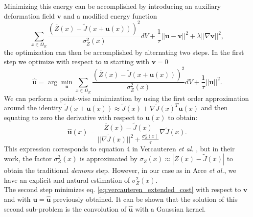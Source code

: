 Minimizing this energy can be accomplished by introducing an auxiliary deformation field $\mathbf{v}$ and a modified energy function
\begin{equation}\label{eq:vercauteren_extended_cost}
    \sum_{x \in \Omega_{R}} \frac{(\overline{Z}(x) - \tilde{J}(x + \mathbf{u}(x)))^{2}}{\sigma^{2}_{Z}(x)} dV + \frac{1}{\tau}||\mathbf{u}-\mathbf{v}||^{2}+\lambda ||\nabla \mathbf{v}||^{2},
\end{equation}
the optimization can then be accomplished by alternating two steps. In the first step we optimize with respect to $\mathbf{u}$ starting with $\mathbf{v} = 0$
\begin{equation}\label{eq:vercauteren_step1}
    \widehat{\mathbf{u}} = \arg\min_{\mathbf{u}}\sum_{x \in \Omega_{R}} \frac{(\overline{Z}(x) - \tilde{J}(x+\mathbf{u}(x)))^{2}}{\sigma^{2}_{Z}(x)} dV + \frac{1}{\tau} ||\mathbf{u}||^{2}.
\end{equation}
We can perform a point-wise minimization by using the first order approximation around the identity
$\tilde{J}(x+\mathbf{u}(x)) \approx \tilde{J}(x) + \nabla \tilde{J}(x)^{T}\mathbf{u}(x)$ and then equating to zero the derivative with respect to $\mathbf{u}(x)$ to obtain:
\begin{equation}\label{eq:euler_lagrange_step1}
    \widehat{\mathbf{u}}(x) = \frac{\overline{Z}(x) - \tilde{J}(x)}{||\nabla \tilde{J}(x)||^{2} + \frac{\sigma_{Z}^{2}(x)}{\tau}}\nabla \tilde{J}(x).
\end{equation}
This expression corresponds to equation 4 in Vercauteren {\it et al.} \cite{Vercauteren2009}, but in their work, the factor $\sigma_{Z}^{2}(x)$
is approximated by $\sigma_{Z}(x) \approx |\overline{Z}(x) - \tilde{J}(x)|$ to obtain the traditional {\it demons} step. However, in our case as in Arce
{\it et al.}\cite{Arce-santana2014}, we have an explicit and natural estimation of $\sigma^{2}_{Z}(x)$.\\

The second step minimizes eq. \ref{eq:vercauteren_extended_cost} with respect to $\mathbf{v}$ and with $\mathbf{u}=\widehat{\mathbf{u}}$ previously obtained. It can be
shown that the solution of this second sub-problem is the convolution of $\widehat{\mathbf{u}}$ with a Gaussian kernel\cite{Vercauteren2009}.\\

